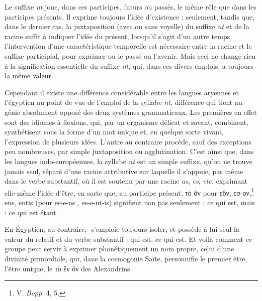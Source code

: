 \documentclass[letterpaper,twocolumn,openany,nodeprecatedcode]{dndbook}
\newcommand*\hieroAAAQ{}
\begin{document}
Le suffixe \emph{nt} joue, dans ces participes, futurs ou passés, le même rôle que dans les participes présents. Il exprime toujours l'idée d'existence ; seulement, tandis que, dans le dernier cas, la juxtaposition (avec ou sans voyelle) du suffixe \emph{nt} et de la racine suffit à indiquer l'idée du présent, lorsqu'il s'agit d'un autre temps, l'intervention d'une caractéristique temporelle est nécessaire entre la racine et le suffixe participial, pour exprimer ou le passé ou l'avenir. Mais ceci ne change rien à la signification essentielle du suffixe \emph{nt}, qui, dans ces divers emplois, a toujours la même valeur.

Cependant il existe une différence considérable entre les langues aryennes et l'égyptien au point de vue de l'emploi de la syllabe \emph{nt}, différence qui tient au génie absolument opposé des deux systèmes grammaticaux. Les premières en effet sont des idiomes à flexions, qui, par un organisme délicat et savant, combinent, synthétisent sous la forme d'un mot unique et, en quelque sorte vivant, l'expression de plusieurs idées. L'autre au contraire procède, sauf des exceptions peu nombreuses, par simple juxtaposition ou agglutination. C'est ainsi que, dans les langues indo-européennes, la syllabe \emph{nt} est un simple suffixe, qu'on ne trouve jamais seul, séparé d'une racine attributive sur laquelle il s'appuie, pas même dans le verbe substantif, où il est soutenu par une racine \emph{as}, \emph{es}, \emph{etc.} exprimant elle-même l'idée d'être, en sorte que, au participe présent, τὸ ὃν pour εὃν, εσ-ον,\footnote{V. \emph{Bopp}, 4, 5.} ens, entis (pour es-e-ns , es-e-nt-is) signifient non pas seulement : ce qui est, mais : ce qui est étant.

En Égyptien, au contraire, $\hieroAAAQ$ s'emploie toujours isoler, et possède à lui seul la valeur du relatif et du verbe substantif : qui est, ce qui est. Et voilà comment ce groupe peut servir à exprimer phonétiquement un nom propre, celui d'une divinité primordiale, qui, dans la cosmogonie Saïte, personnifie le premier être, l'être unique, le τὸ ἕν ὃν des Alexandrins.
\end{document}
